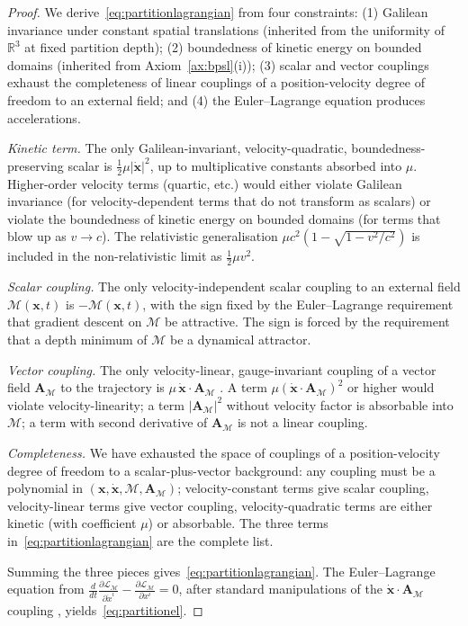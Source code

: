 \documentclass[11pt,twocolumn,a4paper]{article}
\theoremstyle{axiomstyle}
\theoremstyle{conseqstyle}
\theoremstyle{definition}
\theoremstyle{remark}
\newcommand{\Depth}{\mathcal{M}}
\newcommand{\Real}{\mathbb{R}}
\newcommand{\Apartition}{\bm{A}_{\Depth}}
\newcommand{\Lagr}{\mathcal{L}}
\begin{document}
\begin{proof}
We derive~\eqref{eq:partitionlagrangian} from four constraints: (1) Galilean invariance under constant spatial translations (inherited from the uniformity of $\Real^{3}$ at fixed partition depth); (2) boundedness of kinetic energy on bounded domains (inherited from Axiom~\ref{ax:bpsl}(i)); (3) scalar and vector couplings exhaust the completeness of linear couplings of a position-velocity degree of freedom to an external field; and (4) the Euler--Lagrange equation produces accelerations.

\emph{Kinetic term.} The only Galilean-invariant, velocity-quadratic, boundedness-preserving scalar is $\tfrac{1}{2}\mu|\dot{\mathbf{x}}|^{2}$, up to multiplicative constants absorbed into $\mu$. Higher-order velocity terms (quartic, etc.) would either violate Galilean invariance (for velocity-dependent terms that do not transform as scalars) or violate the boundedness of kinetic energy on bounded domains (for terms that blow up as $v\to c$). The relativistic generalisation $\mu c^{2}(1-\sqrt{1-v^{2}/c^{2}})$ is included in the non-relativistic limit as $\tfrac{1}{2}\mu v^{2}$.

\emph{Scalar coupling.} The only velocity-independent scalar coupling to an external field $\Depth(\mathbf{x},t)$ is $-\Depth(\mathbf{x},t)$, with the sign fixed by the Euler--Lagrange requirement that gradient descent on $\Depth$ be attractive. The sign is forced by the requirement that a depth minimum of $\Depth$ be a dynamical attractor.

\emph{Vector coupling.} The only velocity-linear, gauge-invariant coupling of a vector field $\Apartition$ to the trajectory is $\mu\,\dot{\mathbf{x}}\cdot\Apartition$ \citep{landaulifshitz1}. A term $\mu(\dot{\mathbf{x}}\cdot\Apartition)^{2}$ or higher would violate velocity-linearity; a term $|\Apartition|^{2}$ without velocity factor is absorbable into $\Depth$; a term with second derivative of $\Apartition$ is not a linear coupling.

\emph{Completeness.} We have exhausted the space of couplings of a position-velocity degree of freedom to a scalar-plus-vector background: any coupling must be a polynomial in $(\mathbf{x},\dot{\mathbf{x}},\Depth,\Apartition)$; velocity-constant terms give scalar coupling, velocity-linear terms give vector coupling, velocity-quadratic terms are either kinetic (with coefficient $\mu$) or absorbable. The three terms in~\eqref{eq:partitionlagrangian} are the complete list.

Summing the three pieces gives~\eqref{eq:partitionlagrangian}. The Euler--Lagrange equation from $\frac{d}{dt}\frac{\partial\Lagr_{\Depth}}{\partial\dot{x}^{i}}-\frac{\partial\Lagr_{\Depth}}{\partial x^{i}}=0$, after standard manipulations of the $\dot{\mathbf{x}}\cdot\Apartition$ coupling \citep[pp. 48--51]{landaulifshitz1}, yields~\eqref{eq:partitionel}.
\end{proof}
\end{document}
